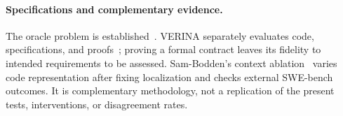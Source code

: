 \paragraph{Specifications and complementary evidence.}
The oracle problem is established~\cite{barr2015oracle}. VERINA separately evaluates
code, specifications, and proofs~\cite{ye2026verina}; proving a formal contract leaves
its fidelity to intended requirements to be assessed. Sam-Bodden's context
ablation~\cite{sambodden2026context} varies code representation after fixing localization
and checks external SWE-bench outcomes. It is complementary methodology, not a replication
of the present tests, interventions, or disagreement rates.
